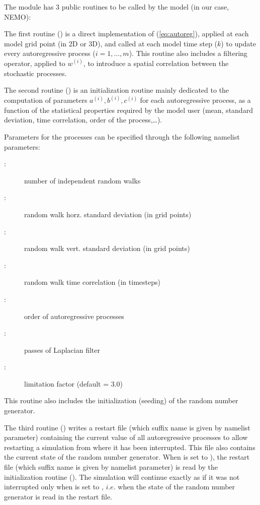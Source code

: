 \documentclass[../main/NEMO_manual]{subfiles}
\begin{document}
The  module has 3 public routines to be called by the model (in our case, NEMO):

The first routine () is a direct implementation of (\autoref{eq:autoreg}),
applied at each model grid point (in 2D or 3D), and called at each model time step ($k$) to
update every autoregressive process ($i=1,\ldots,m$).
This routine also includes a filtering operator, applied to $w^{(i)}$,
to introduce a spatial correlation between the stochastic processes.

The second routine () is an initialization routine mainly dedicated to
the computation of parameters $a^{(i)}, b^{(i)}, c^{(i)}$ for each autoregressive process,
as a function of the statistical properties required by the model user
(mean, standard deviation, time correlation, order of the process,\ldots). 

Parameters for the processes can be specified through the following  namelist parameters:
\begin{description}
\item[:]   number of independent random walks
\item[:] random walk horz. standard deviation (in grid points)
\item[:]  random walk vert. standard deviation (in grid points)
\item[:]  random walk time correlation (in timesteps)
\item[:]   order of autoregressive processes
\item[:]   passes of Laplacian filter
\item[:]   limitation factor (default = 3.0)
\end{description}
This routine also includes the initialization (seeding) of the random number generator.

The third routine () writes a restart file
(which suffix name is given by  namelist parameter) containing the current value of
all autoregressive processes to allow restarting a simulation from where it has been interrupted.
This file also contains the current state of the random number generator.
When  is set to ),
the restart file (which suffix name is given by  namelist parameter) is read by
the initialization routine ().
The simulation will continue exactly as if it was not interrupted only
when  is set to ,
$i.e.$ when the state of the random number generator is read in the restart file.

\biblio
\end{document}
